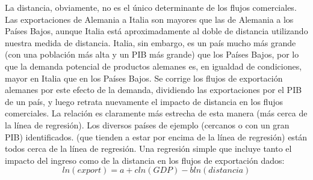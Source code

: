    La distancia, obviamente, no es el único determinante de los flujos comerciales. Las exportaciones de Alemania a Italia son mayores que las de Alemania a los Países Bajos, aunque Italia está aproximadamente al doble de distancia utilizando nuestra medida de distancia. Italia, sin embargo, es un país mucho más grande (con una población más alta y un PIB más grande) que los Países Bajos, por lo que la demanda potencial de productos alemanes es, en igualdad de condiciones, mayor en Italia que en los Países Bajos.  Se corrige los flujos de exportación alemanes por este efecto de la demanda, dividiendo las exportaciones por el PIB de un país, y luego retrata nuevamente el impacto de distancia en los flujos comerciales. La relación es claramente más estrecha de esta manera (más cerca de la línea de regresión). Los diversos países de ejemplo (cercanos o con un gran PIB) identificados. (que tienden a estar por encima de la línea de regresión) están todos cerca de la línea de regresión. Una regresión simple que incluye tanto el impacto del ingreso como de la distancia en los flujos de exportación dados:
   $$ln(export) = a + c ln(GDP) - b ln(distancia)$$

